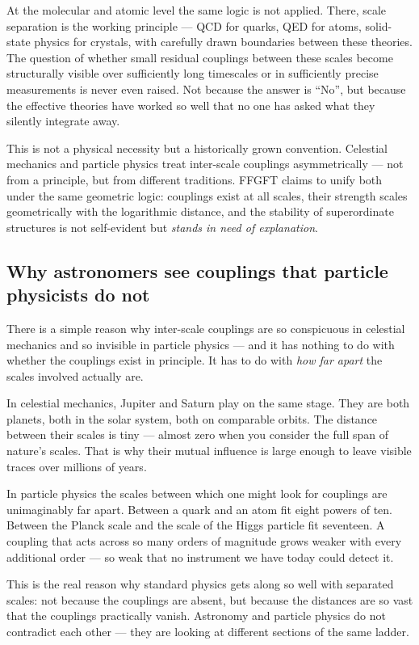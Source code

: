 At the molecular and atomic level the same logic is not applied.
There, scale separation is the working principle --- QCD for quarks,
QED for atoms, solid-state physics for crystals, with carefully drawn
boundaries between these theories. The question of whether small
residual couplings between these scales become structurally visible
over sufficiently long timescales or in sufficiently precise
measurements is never even raised. Not because the answer is ``No'',
but because the effective theories have worked so well that no one has
asked what they silently integrate away.

This is not a physical necessity but a historically grown convention.
Celestial mechanics and particle physics treat inter-scale couplings
asymmetrically --- not from a principle, but from different traditions.
FFGFT claims to unify both under the same geometric logic: couplings
exist at all scales, their strength scales geometrically with the
logarithmic distance, and the stability of superordinate structures is
not self-evident but \emph{stands in need of explanation}.

\subsection*{Why astronomers see couplings that particle physicists do not}

There is a simple reason why inter-scale couplings are so conspicuous
in celestial mechanics and so invisible in particle physics --- and it
has nothing to do with whether the couplings exist in principle. It
has to do with \emph{how far apart} the scales involved actually are.

In celestial mechanics, Jupiter and Saturn play on the same stage.
They are both planets, both in the solar system, both on comparable
orbits. The distance between their scales is tiny --- almost zero when
you consider the full span of nature's scales. That is why their
mutual influence is large enough to leave visible traces over millions
of years.

In particle physics the scales between which one might look for
couplings are unimaginably far apart. Between a quark and an atom fit
eight powers of ten. Between the Planck scale and the scale of the
Higgs particle fit seventeen. A coupling that acts across so many
orders of magnitude grows weaker with every additional order ---
so weak that no instrument we have today could detect it.

This is the real reason why standard physics gets along so well with
separated scales: not because the couplings are absent, but because
the distances are so vast that the couplings practically vanish.
Astronomy and particle physics do not contradict each other --- they
are looking at different sections of the same ladder.

